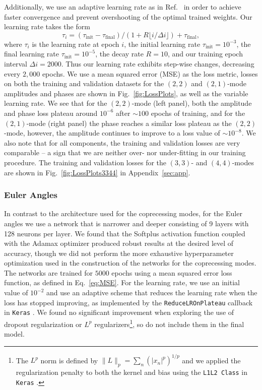 \documentclass[prd,amssymb,amsmath,amsfonts,superscriptaddress,nofootinbib,reprint,showpacs, longbibliography]{revtex4-1}
\newcommand{\keras}{\texttt{Keras}{ }}
\begin{document}
Additionally, we use an adaptive learning rate as in Ref.~\cite{Khan:2020fso} in order to achieve faster convergence and prevent overshooting of the optimal trained weights. Our learning rate takes the form
\begin{equation}
    \tau_{i} = (\tau_{\text{init}} - \tau_{\text{final}}) / (1 + R \lfloor i / \Delta i \rfloor) + \tau_{\text{final}},
    \label{eq:LearningRate}
\end{equation}
where $\tau_{i}$ is the learning rate at epoch $i$, the initial learning rate $\tau_{\text{init}}=10^{-3}$, the final learning rate $\tau_{\text{init}}=10^{-5}$, the decay rate $R=10$, and our training epoch interval $\Delta i = 2000$. Thus our learning rate exhibits step-wise changes, decreasing every $2,000$ epochs. We use a mean squared error (MSE) as the loss metric, losses on both the training and validation datasets for the $(2,2)$ and $(2,1)$-mode amplitudes and phases are shown in Fig.~\ref{fig:LossPlots}, as well as the variable learning rate. We see that for the $(2,2)$-mode (left panel), both the amplitude and phase loss plateau around $10^{-6}$ after $\sim 100$ epochs of training, and for the $(2,1)$-mode (right panel) the phase reaches a similar loss plateau as the $(2,2)$-mode, however, the amplitude continues to improve to a loss value of $\sim 10^{-8}$. We also note that for all components, the training and validation losses are very comparable -- a sign that we are neither over- nor under-fitting in our training procedure. The training and validation losses for the $(3,3)$- and $(4,4)$-modes are shown in Fig.~\ref{fig:LossPlots3344} in Appendix~\ref{sec:app}.

\subsubsection{Euler Angles}
\label{subsec:EulerAngles}
In contrast to the architecture used for the coprecessing modes, for the Euler angles we use a network that is narrower and deeper consisting of 9 layers with 128 neurons per layer. We found that the Softplus activation function coupled with the Adamax optimizer produced robust results at the desired level of accuracy, though we did not perform the more exhaustive hyperparameter optimization used in the construction of the networks for the coprecessing modes. The networks are trained for $5000$ epochs using a mean squared error loss function, as defined in Eq.~\eqref{eq:MSE}. For the learning rate, we use an initial value of $10^{-2}$ and use an adaptive scheme that reduces the learning rate when the loss has stopped improving, as implemented by the \texttt{ReduceLROnPlateau} callback in \keras. We found no significant improvement when exploring the use of dropout regularization or $L^p$ regularizers\footnote{The $L^p$ norm is defined by $\| L \|_p = \sum_n \left( | x_n |^p \right)^{1/p}$ and we applied the regularization penalty to both the kernel and bias using the \texttt{L1L2 Class} in \keras.}, so do not include them in the final model.
\end{document}
